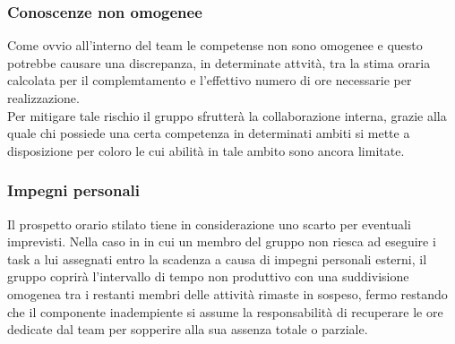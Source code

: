 \subsubsection{Conoscenze non omogenee}
Come ovvio all'interno del team le competense non sono omogenee e questo potrebbe causare una discrepanza, in determinate attvità, tra la stima oraria calcolata per il complemtamento e l'effettivo numero di ore necessarie per  realizzazione.
\\
Per mitigare tale rischio il gruppo sfrutterà la collaborazione interna, grazie alla quale chi possiede una certa competenza in determinati ambiti si mette a disposizione per coloro le cui abilità in tale ambito sono ancora limitate. 

\subsubsection{Impegni personali}
Il prospetto orario stilato tiene in considerazione uno scarto per eventuali imprevisti.
Nella caso in in cui un membro del gruppo non riesca ad eseguire i task a lui assegnati entro la scadenza a causa di impegni personali esterni, il gruppo coprirà l'intervallo di tempo non produttivo con una suddivisione omogenea tra i restanti membri delle attività rimaste in sospeso, fermo restando che il componente inadempiente si assume la responsabilità di recuperare le ore dedicate dal team per sopperire alla sua assenza totale o parziale.



